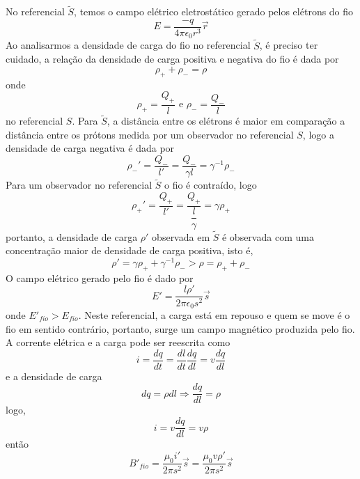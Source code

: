 \documentclass[10pt,a4paper]{article}
\begin{document}
\begin{enumerate}
\begin{enumerate}
		No referencial $\tilde{S}$, temos o campo elétrico eletrostático gerado pelos elétrons do fio
		\begin{equation*}
			E = \dfrac{-q}{4\pi \epsilon_0 r^3}\vec{r}
		\end{equation*}
		Ao analisarmos a densidade de carga do fio no referencial $\tilde{S}$, é preciso ter cuidado, a relação da densidade de carga positiva e negativa do fio é dada por
		\begin{equation*}
			\rho_+ +\rho_- = \rho
		\end{equation*}
		onde
		\begin{equation*}
			\rho_+ = \frac{Q_+}{l}\text{ e  } \rho_- = \frac{Q_-}{l}
		\end{equation*}
		no referencial $ S $.
		Para $\tilde{S}$, a distância entre os elétrons é maior em comparação a distância entre os prótons medida por um observador no referencial $ S $, logo a densidade de carga negativa é dada por
		\begin{equation*}
			\rho_-'  = \dfrac{Q_-}{l'}=\dfrac{Q_-}{\gamma l} = \gamma^{-1} \rho_-
		\end{equation*}
		Para um observador no referencial $\tilde{S}$ o fio é contraído, logo
		\begin{equation*}
			\rho_+\prime = \dfrac{Q_+}{l\prime} = \dfrac{Q_+}{\dfrac{l}{\gamma}} = \gamma\rho_+
		\end{equation*}
		portanto, a densidade de carga $\rho\prime$ observada em $\tilde{S}$ é observada com uma concentração maior de densidade de carga positiva, isto é,
		\begin{equation*}
			\rho\prime = \gamma\rho_+ + \gamma^{-1}\rho_- > \rho = \rho_+ + \rho_-
		\end{equation*}
		O campo elétrico gerado pelo fio é dado por
		\begin{equation*}
			E' = \dfrac{l\rho\prime }{2\pi \epsilon_0s^2 }\vec{s}
		\end{equation*}
		onde $ E'_{fio} > E_{fio} $.
		Neste referencial, a carga está em repouso e quem se move é o fio em sentido contrário, portanto, surge um campo magnético produzida pelo fio. A corrente elétrica e a carga pode ser reescrita como 
		\begin{equation*}
			i = \dfrac{dq}{dt} = \dfrac{dl}{dt}\dfrac{dq}{dl} = v \dfrac{dq}{dl}
		\end{equation*}
		e a densidade de carga
		\begin{equation*}
			dq = \rho dl \Rightarrow \dfrac{dq}{dl} = \rho
		\end{equation*}
		logo,
		\begin{equation*}
			i = v\dfrac{dq}{dl} = v\rho
		\end{equation*}	
		então
		\begin{equation*}
			B'_{fio} = \dfrac{\mu_0 i\prime}{2\pi s^2}\vec{s} = \dfrac{\mu_0 v\rho\prime}{2\pi s^2}\vec{s}
		\end{equation*}
	

\end{enumerate}
\end{enumerate}
\end{document}
